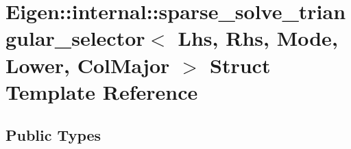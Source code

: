 \hypertarget{struct_eigen_1_1internal_1_1sparse__solve__triangular__selector_3_01_lhs_00_01_rhs_00_01_mode_00_01_lower_00_01_col_major_01_4}{}\section{Eigen\+:\+:internal\+:\+:sparse\+\_\+solve\+\_\+triangular\+\_\+selector$<$ Lhs, Rhs, Mode, Lower, Col\+Major $>$ Struct Template Reference}
\label{struct_eigen_1_1internal_1_1sparse__solve__triangular__selector_3_01_lhs_00_01_rhs_00_01_mode_00_01_lower_00_01_col_major_01_4}
\subsection*{Public Types}
